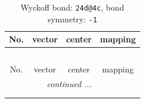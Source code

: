 \documentclass[fleqn,8pt]{jsarticle}
\begin{document}
\renewcommand{\arraystretch}{1.2}
\begin{longtable}{cccc}
\caption{Wyckoff bond: {\tt 24d@4c}, bond symmetry: {\tt -1}}
 \\
 \hline \hline
No. & vector & center & mapping \\ \hline \endfirsthead

\multicolumn{3}{l}{\tablename\ \thetable{}} \\
 \hline \hline
No. & vector & center & mapping \\ \hline \endhead

 \hline \hline
\multicolumn{3}{r}{\footnotesize\it continued ...} \\ \endfoot

 \hline \hline
\multicolumn{3}{r}{} \\ \endlastfoot


\end{longtable}
\end{document}
